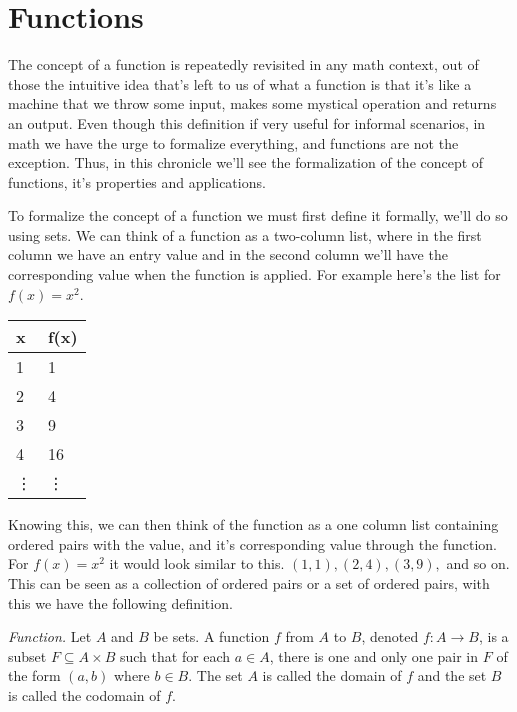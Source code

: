 \documentclass{report}
\begin{document}
    \tableofcontents

    \pagebreak
    \chapter{ Functions }

    The concept of a function is repeatedly revisited in any math context, out of those the intuitive idea that's left to us of what a function is that it's like a machine that we throw some input, makes some mystical operation and returns an output. Even though this definition if very useful for informal scenarios, in math we have the urge to formalize everything, and functions are not the exception. Thus, in this chronicle we'll see the formalization of the concept of functions, it's properties and applications.

    To formalize the concept of a function we must first define it formally, we'll do so using sets. We can think of a function as a two-column list, where in the first column we have an entry value and in the second column we'll have the corresponding value when the function is applied. For example here's the list for $f(x) = x^2$.

    \begin{table}[h]
        \centering
        \begin{tabular}{l|l}
        x & f(x) \\ \hline
        1 & 1    \\
        2 & 4    \\
        3 & 9    \\
        4 & 16   \\
        \vdots & \vdots
        \end{tabular}
    \end{table}

    Knowing this, we can then think of the function as a one column list containing ordered pairs with the value, and it's corresponding value through the function. For $f(x) = x^2$ it would look similar to this. $(1, 1), (2, 4), (3, 9),$ and so on. This can be seen as a collection of ordered pairs or a set of ordered pairs, with this we have the following definition.\\

    \begin{defBox}
        \textit{Function.} Let $A$ and $B$ be sets. A function $f$ from $A$ to $B$, denoted $f: A \rightarrow B$, is a subset $F \subseteq A \times B$ such that for each $a \in A$, there is one and only one pair in $F$ of the form $(a, b)$ where $b \in B$. The set $A$ is called the domain of $f$ and the set $B$ is called the codomain of $f$.
    \end{defBox}
\end{document}

